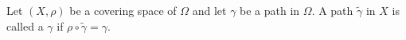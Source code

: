 Let $(X, \rho)$ be a covering space of $\Omega$ and let $\gamma$ be a path in $\Omega$. A path $\tilde{\gamma}$ in $X$ is called a  $\gamma$ if $\rho \circ \tilde{\gamma} = \gamma$.

